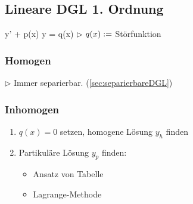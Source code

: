 \subsection{Lineare DGL 1. Ordnung}
    \vspace{0.5em}
    \mathbox%
    {
        y' + p(x) \cdot y = q(x)
    }
    $\triangleright$ $q(x) \vcentcolon=$ Störfunktion
    
    \subsubsection{Homogen}
        \vspace{0.5em}
        $\triangleright$ Immer separierbar. (\ref{sec:separierbareDGL})

    \subsubsection{Inhomogen}\label{sec:1.Ord-homogen}
        \vspace{0.5em}
        \begin{enumerate}
            \item $q(x) = 0$ setzen, homogene Lösung $y_h$ finden
            \item Partikuläre Lösung $y_p$ finden:
            \begin{itemize}
                \item Ansatz von Tabelle %
                \item Lagrange-Methode %
            \end{itemize}
        \end{enumerate}


